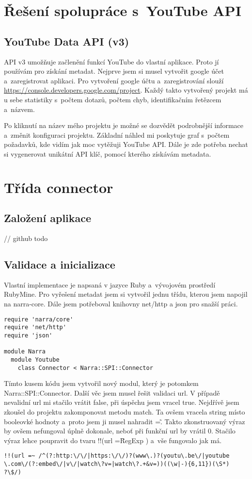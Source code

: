 \section{Řešení spolupráce s~YouTube API}
\subsection{YouTube Data API (v3)}
\par API v3 umožňuje začlenění funkcí YouTube do vlastní aplikace. Proto jí používám pro získání metadat. Nejprve jsem si musel vytvořit google účet a~zaregistrovat aplikaci. Pro vytvoření google účtu a~zaregistrování slouží \url{https://console.developers.google.com/project}. Každý takto vytvořený projekt má u sebe statistiky s~počtem dotazů, počtem chyb, identifikačním řetězcem a~názvem. 
\par Po kliknutí na název mého projektu je možné se dozvědět podrobnější informace a~změnit konfiguraci projektu. Základní náhled mi poskytuje graf s~počtem požadavků, kde vidím jak moc vytěžuji YouTube API. Dále je zde potřeba nechat si vygenerovat unikátní API klíč, pomocí kterého získávám metadata.

\section{Třída connector}
\subsection{Založení aplikace}
\par // github todo


\subsection{Validace a inicializace}
\par Vlastní implementace je napsaná v jazyce Ruby a~vývojovém prostředí RubyMine. Pro vyřešení metadat jsem si vytvořil jednu třídu, kterou jsem napojil na narra-core. Dále jsem potřeboval knihovny net/http a json pro snažší práci.
\begin{verbatim}
require 'narra/core'
require 'net/http'
require 'json'

module Narra
  module Youtube
    class Connector < Narra::SPI::Connector
\end{verbatim}
\par Tímto kusem kódu jsem vytvořil nový modul, který je potomkem Narra::\-SPI::Connector. Další věc jsem musel řešit validaci url. V případě nevalidní url mi stačilo vrátit false, při úspěchu jsem vracel true. Nejdřívě jsem zkoušel do projektu zakomponovat metodu match. Ta ovšem vracela string místo booleovké hodnoty a~proto jsem ji musel nahradit =\~. Takto zkonstruovaný výraz by ovšem nefungoval úplně dokonale, neboť při funkční url by vrátil 0. Stačilo výraz lehce poupravit do tvaru !!(url =\~ RegExp ) a~vše fungovalo jak má.
\begin{verbatim}
!!(url =~ /^(?:http:\/\/|https:\/\/)?(www\.)?(youtu\.be\/|youtube
\.com\/(?:embed\/|v\/|watch\?v=|watch\?.+&v=))((\w|-){6,11})(\S*)
?\$/)
\end{verbatim}

